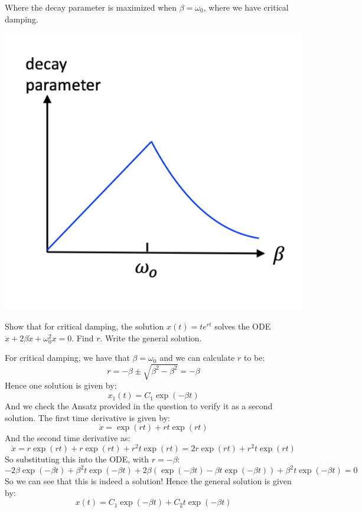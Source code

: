 \begin{s}
Where the decay parameter is maximized when $\beta = \omega_0$, where we have critical damping.
\begin{center}
    \includegraphics[scale=0.5]{Lecture-9/w9-img1.png}
\end{center}
\end{s}

\begin{p}
Show that for critical damping, the solution $x(t) = te^{rt}$ solves the ODE $\ddot{x} + 2\beta\dot{x} + \omega_0^2x = 0$. Find $r$. Write the general solution.
\end{p}
\begin{s}
For critical damping, we have that $\beta = \omega_0$ and we can calculate $r$ to be:
\[r = -\beta \pm \sqrt{\beta^2 - \beta^2} = -\beta\]
Hence one solution is given by:
\[x_1(t) = C_1\exp(-\beta t)\]
And we check the Ansatz provided in the question to verify it as a second solution. The first time derivative is given by:
\[\dot{x} = \exp(rt) + rt\exp(rt)\]
And the second time derivative as:
\[\ddot{x} = r\exp(rt) + r\exp(rt) + r^2t\exp(rt) = 2r\exp(rt) + r^2t\exp(rt)\]
So substituting this into the ODE, with $r = -\beta$:
\[-2\beta\exp(-\beta t) + \beta^2t\exp(-\beta t) + 2\beta\left(\exp(-\beta t) - \beta t\exp(-\beta t)\right) + \beta^2t\exp(-\beta t) = 0\]
So we can see that this is indeed a solution! Hence the general solution is given by:
\[x(t) = C_1\exp(-\beta t) + C_2 t\exp(-\beta t)\]
\end{s}


